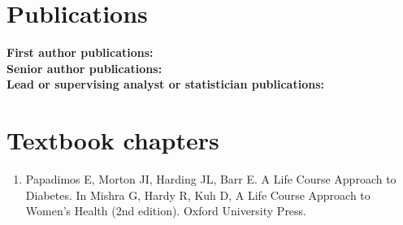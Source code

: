 \documentclass[11pt]{article}
\begin{document}
\clearpage
\section*{Publications}
\noindent \textbf{First author publications:}
\cite{MortonAth2026,
MehtaDL2026,
MagLDE2026,
MortonDRCP2026,
GongLDE2025,
MortonAth2025,
MortonEJPC2025,
MortonIJMI2025,
MortonPECA2024,
MortonVIH2024,
MortonDRCP2024,
MortonPECA2023,
MortonAJKD2023,
MortonVIH2023,
MortonDLOGIA2023,
MortonEJPC2023,
QuigleyDRCP2022,
MortonDRCP2022,
MortonDM2022b,
MortonJECH2022,
MortonDC2022,
MortonJONS2022,
MortonDM2022a,
HardingNDT2022,
MortonDC2021,
MortonDLOGIA2021,
MortonDC2020} \\

\noindent \textbf{Senior author publications:}
\cite{LivoriBJCP2026,
LivoriAJCD2026,
LivoriRSAP2025,
TamratJIGM2025,
LivoriHLC2024,
AbebeNeu2024,
DoodyAGG2024,
LivoriIJC2024,
LivoriEJPC2023,
DoodyAGG2023} \\

\noindent \textbf{Lead or supervising analyst or statistician publications:}
\cite{ZomerDTT2025,
DMLDE2024,
DMMJA2024,
TanCPT2024,
LordPPT2023,
TomicLDE2022}


\clearpage

\section*{Textbook chapters}
\begin{enumerate}
\item Papadimos E, Morton JI, Harding JL, Barr E. 
A Life Course Approach to Diabetes. 
In Mishra G, Hardy R, Kuh D, A Life Course Approach to Women's Health (2nd edition). 
Oxford University Press.  
\end{enumerate}
\end{document}
